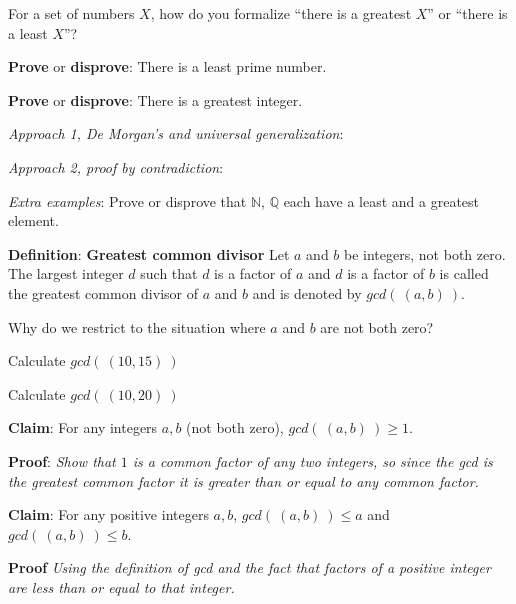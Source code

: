 \documentclass[12pt, oneside]{article}
\begin{document}
For a set of numbers $X$, how do you formalize ``there is a greatest $X$'' 
or ``there is a least $X$''?

\vspace{30pt}

{\bf Prove} or {\bf  disprove}:  There is a least prime number.

\vspace{100pt}

{\bf Prove} or {\bf  disprove}: There is a greatest integer. 

{\it Approach 1, De Morgan's and universal generalization}: 

\vspace{100pt}

{\it Approach 2, proof by contradiction}: 

\vspace{200pt}

{\it Extra examples}: 
Prove or disprove that $\mathbb{N}$,  $\mathbb{Q}$ each have a
least and a greatest element. 
 


{\bf Definition}: {\bf Greatest common divisor} Let $a$ and $b$ be integers, not both zero. The largest integer $d$ such that 
$d$ is a  factor of $a$ and $d$ is a factor of  $b$ is called the greatest common divisor of $a$ and $b$ 
and is denoted by $gcd(~(a, b)~)$. 

Why do we restrict to the situation where $a$ and $b$ are not both zero?

\vspace{50pt}


Calculate $gcd(~(10,15)~)$

\vspace{50pt}

Calculate $gcd(~(10,20)~)$

\vspace{50pt} 

{\bf Claim}: For any integers $a,b$ (not both zero), $gcd(~(a,b)~) \geq 1$.

{\bf Proof}: {\it Show that $1$ is a common factor of any two integers, so since the gcd 
is the greatest common factor it is greater than or equal to any common factor.}

\vspace{150pt}

{\bf Claim}: For any positive integers $a,b$, $gcd(~(a,b)~) \leq a$ and $gcd( ~(a,b)~) \leq b$.

{\bf Proof} {\it Using the definition of gcd and the fact that factors of a positive integer
are less than or equal to that integer.}
\end{document}
